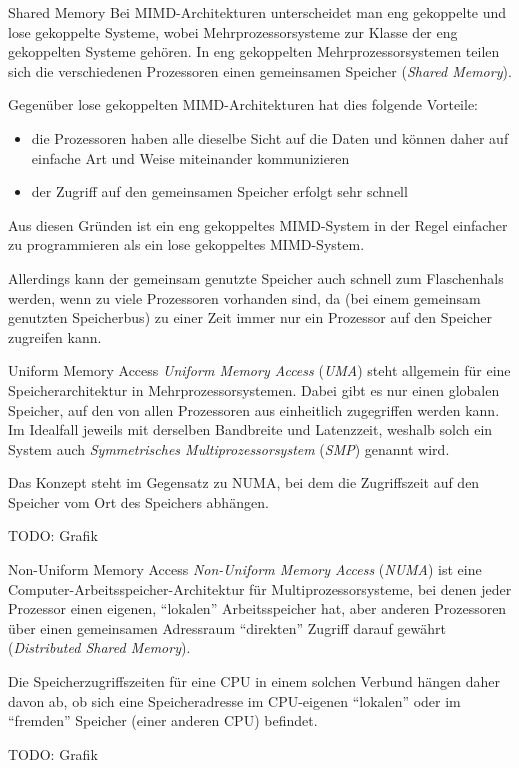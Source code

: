 \begin{defi}{Shared Memory}
    Bei MIMD-Architekturen unterscheidet man eng gekoppelte und lose gekoppelte Systeme, wobei Mehrprozessorsysteme zur Klasse der eng gekoppelten Systeme gehören.
    In eng gekoppelten Mehrprozessorsystemen teilen sich die verschiedenen Prozessoren einen gemeinsamen Speicher (\emph{Shared Memory}).

    Gegenüber lose gekoppelten MIMD-Architekturen hat dies folgende Vorteile:
    \begin{itemize}
        \item die Prozessoren haben alle dieselbe Sicht auf die Daten und können daher auf einfache Art und Weise miteinander kommunizieren
        \item der Zugriff auf den gemeinsamen Speicher erfolgt sehr schnell
    \end{itemize}

    Aus diesen Gründen ist ein eng gekoppeltes MIMD-System in der Regel einfacher zu programmieren als ein lose gekoppeltes MIMD-System.

    Allerdings kann der gemeinsam genutzte Speicher auch schnell zum Flaschenhals werden, wenn zu viele Prozessoren vorhanden sind, da (bei einem gemeinsam genutzten Speicherbus) zu einer Zeit immer nur ein Prozessor auf den Speicher zugreifen kann.
\end{defi}

\begin{defi}{Uniform Memory Access}
    \emph{Uniform Memory Access} (\emph{UMA}) steht allgemein für eine Speicherarchitektur in Mehrprozessorsystemen.
    Dabei gibt es nur einen globalen Speicher, auf den von allen Prozessoren aus einheitlich zugegriffen werden kann.
    Im Idealfall jeweils mit derselben Bandbreite und Latenzzeit, weshalb solch ein System auch \emph{Symmetrisches Multiprozessorsystem} (\emph{SMP}) genannt wird.

    Das Konzept steht im Gegensatz zu NUMA, bei dem die Zugriffszeit auf den Speicher vom Ort des Speichers abhängen.

    TODO: Grafik
\end{defi}

\begin{defi}{Non-Uniform Memory Access}
    \emph{Non-Uniform Memory Access} (\emph{NUMA}) ist eine Computer-Arbeitsspeicher-Architektur für Multiprozessorsysteme, bei denen jeder Prozessor einen eigenen, \enquote{lokalen} Arbeitsspeicher hat, aber anderen Prozessoren über einen gemeinsamen Adressraum \enquote{direkten} Zugriff darauf gewährt (\emph{Distributed Shared Memory}).

    Die Speicherzugriffszeiten für eine CPU in einem solchen Verbund hängen daher davon ab, ob sich eine Speicheradresse im CPU-eigenen \enquote{lokalen} oder im \enquote{fremden} Speicher (einer anderen CPU) befindet.

    TODO: Grafik
\end{defi}


